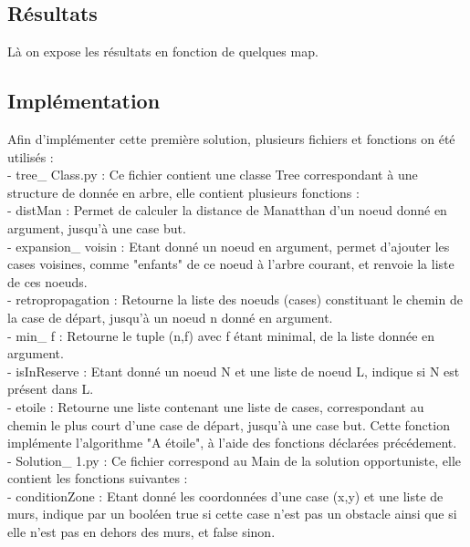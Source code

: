 \documentclass{article}
\begin{document}
	\subsection{Résultats}
	
	Là on expose les résultats en fonction de quelques map.
	
	\subsection{Implémentation}

Afin d'implémenter cette première solution, plusieurs fichiers et fonctions on été utilisés :\\

- tree\_ Class.py : Ce fichier contient une classe Tree correspondant à une structure de donnée en arbre, elle contient plusieurs fonctions :\\ 
	
- distMan : Permet de calculer la distance de Manatthan d'un noeud donné en argument, jusqu'à une case but.\\ 
	
- expansion\_ voisin : Etant donné un noeud en argument, permet d'ajouter les cases voisines, comme "enfants" de ce noeud à l'arbre courant, et renvoie la liste de ces noeuds.\\ 
	
- retropropagation : Retourne la liste des noeuds (cases) constituant le chemin de la case de départ, jusqu'à un noeud n donné en argument.\\ 
	
- min\_ f : Retourne le tuple (n,f) avec f étant minimal, de la liste donnée en argument.\\ 
	
- isInReserve : Etant donné un noeud N et une liste de noeud L, indique si N est présent dans L.\\ 
	
- etoile : Retourne une liste contenant une liste de cases, correspondant au chemin le plus court d'une case de départ, jusqu'à une case but.
	Cette fonction implémente l'algorithme "A étoile", à l'aide des fonctions déclarées précédement.\\ 
	
	
- Solution\_ 1.py : Ce fichier correspond au Main de la solution opportuniste, elle contient les fonctions suivantes :\\ 

- conditionZone : Etant donné les coordonnées d'une case (x,y) et une liste de murs, indique par un booléen true si cette case n'est pas un obstacle ainsi que si elle n'est pas en dehors des murs, et false sinon. \\ 
	
\end{document}
